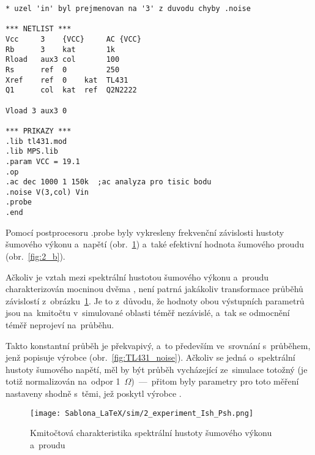 \documentclass[12pt]{CLASS/protokol}
\begin{document}
        \hspace{2cm}

        \begin{lstlisting}[label=ls:2,caption=Obsah souboru .cir pro experiment 2]
* uzel 'in' byl prejmenovan na '3' z duvodu chyby .noise

*** NETLIST ***
Vcc 	3    {VCC}     AC {VCC}
Rb      3    kat       1k
Rload   aux3 col       100
Rs      ref  0 	       250
Xref 	ref  0    kat  TL431
Q1      col  kat  ref  Q2N2222

Vload 3 aux3 0

*** PRIKAZY ***	
.lib tl431.mod
.lib MPS.lib
.param VCC = 19.1
.op
.ac dec 1000 1 150k  ;ac analyza pro tisic bodu
.noise V(3,col) Vin
.probe
.end
        \end{lstlisting}
        \hspace{.5cm}

        Pomocí postprocesoru .probe byly vykresleny frekvenční závislosti hustoty šumového výkonu a~napětí (obr.~\ref{fig:2_a}) a~také efektivní hodnota šumového proudu (obr.~\ref{fig:2_b}).
        \par
        Ačkoliv je vztah mezi spektrální hustotou šumového výkonu a~proudu charakterizován mocninou dvěma \cite{prednasky}, není patrná jakákoliv transformace průběhů závislostí z~obrázku~\ref{fig:2_a}. Je to z~důvodu, že hodnoty obou výstupních parametrů jsou na~kmitočtu v~simulované oblasti téměř nezávislé, a~tak se odmocnění téměř neprojeví na~průběhu.
        \par
        Takto konstantní průběh je překvapivý, a~to především ve~srovnání s~průběhem, jenž popisuje výrobce (obr.~\ref{fig:TL431_noise}). Ačkoliv se jedná o~spektrální hustoty šumového napětí, měl by být průběh vycházející ze~simulace totožný (je totiž normalizován na~odpor 1~$\Omega$)~---~přitom byly parametry pro toto měření nastaveny shodně s~těmi, jež poskytl výrobce \cite{TI_TL431_datasheet}.

        \begin{figure}[h]
            \centering
            \texttt{[image: Sablona\_LaTeX/sim/2\_experiment\_Ish\_Psh.png]}
            \caption{Kmitočtová charakteristika spektrální hustoty šumového výkonu a~proudu~\cite{pspice}}
            \label{fig:2_a}
        \end{figure}
        
\end{document}
